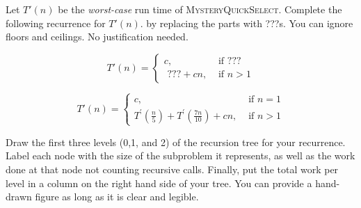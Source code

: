\documentclass[11pt,fleqn]{exam}
\newenvironment{soln}{\color{solnblue}}{}
\newif\ifsolutions\solutionstrue
\newif\ifsolutions\solutionsfalse
\begin{document}
\begin{questions}
\question[3]
Let $T'(n)$ be the {\em worst-case} run time of \textsc{MysteryQuickSelect}. Complete the following
recurrence for $T'(n)$. by replacing the parts with ???s. You can ignore floors and ceilings.  No justification needed.

\ifsolutions

\clearpage
   \else
 \[
   T'(n) = \left\{ \begin{array}{ll}
               c, & \mbox{ if }  \mbox{???} \\
            \mbox{ ???} + cn , & \mbox{ if } n > 1
             \end{array} \right.
   \]

\fi


\begin{soln}
   \[
   T'(n) = \left\{ \begin{array}{ll}
               c, & \mbox{ if }  n = 1 \\
            T^\prime(\frac{n}{5}) + T^\prime(\frac{7n}{10}) + cn , & \mbox{ if } n > 1
             \end{array} \right.
   \]
\end{soln}

\question[3]
Draw the first three levels (0,1, and 2) of the recursion tree for your recurrence. Label each node with the size of the subproblem it represents, as well as the work done at that node not counting recursive calls. Finally, put the total work per level in a column on the right hand side of your tree. You can provide a hand-drawn figure as long as it is clear and legible. 

\ifsolutions
\vspace{.1in}

\else
\fi

\begin{soln}
   \begin{center}
      \end{center}
      

\end{soln}
\end{questions}
\end{document}
